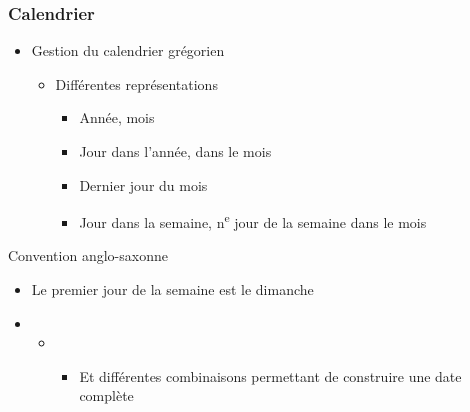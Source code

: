 \documentclass[C++.tex]{subfiles}
\begin{document}
\begin{frame}[fragile]
	\frametitle{Calendrier}
	\begin{itemize}
		\item Gestion du calendrier grégorien
		\begin{itemize}
			\item Différentes représentations
			\begin{itemize}
				\item Année, mois
				\item Jour dans l'année, dans le mois
				\item Dernier jour du mois
				\item Jour dans la semaine, n\textsuperscript{e} jour de la semaine dans le mois
			\end{itemize}
		\end{itemize}
	\end{itemize}

	\begin{alertblock}{Convention anglo-saxonne}
		\begin{itemize}
			\item Le premier jour de la semaine est le dimanche
		\end{itemize}
	\end{alertblock}

	\begin{itemize}
		\item [] \begin{itemize}
			\item [] \begin{itemize}
				\item Et différentes combinaisons permettant de construire une date complète
			\end{itemize}
		\end{itemize}
	\end{itemize}
\end{frame}
\end{document}
